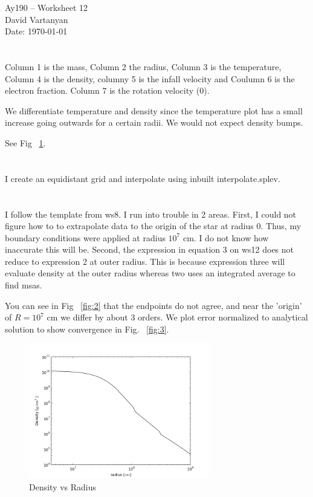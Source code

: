 \documentclass[11pt,letterpaper]{article}
\begin{document}
\begin{center}
\Large
Ay190 -- Worksheet 12\\
David Vartanyan\\
Date: \today
\end{center}

\section{}

Column 1 is the mass, Column 2 the radius, Column 3 is the temperature, Column 4 is the density, columny 5 is the infall velocity and Coulumn 6 is the electron fraction. Column 7 is the rotation velocity (0).

We differentiate temperature and density since the temperature plot has a small increase going outwards for a certain radii. We would not expect density bumps.

See Fig ~\ref{fig:1}.

\section{}
I create an equidistant grid and interpolate using inbuilt interpolate.splev.

\section{}
I follow the template from ws8. I run into trouble in 2 areas. First, I could not figure how to to extrapolate data to the origin of the star at radius 0. Thus, my boundary conditions were applied at radius $10^{7}$ cm. I do not know how inaccurate this will be. Second, the expression in equation 3 on ws12 does not reduce to expression 2 at outer radius. This is because expression three will evaluate density at the outer radius whereas two uses an integrated average to find msas.

You can see in Fig ~\ref{fig:2} that the endpoints do not agree, and near the 'origin' of $R=10^{7} $ cm we differ by about 3 orders. We plot error normalized to analytical solution to show convergence in Fig. ~\ref{fig:3}.

\begin{figure}[bth]
\centering
\includegraphics[width=0.7\textwidth]{ws12fig1.png}
\caption{Density vs Radius}
\label{fig:1}
\end{figure}
\end{document}
